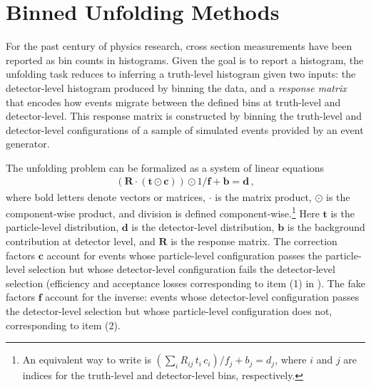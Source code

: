 \section{Binned Unfolding Methods}
\label{sec:binned-unfolding-methods}

For the past century of physics research, cross section measurements have been reported as bin counts in histograms.
Given the goal is to report a histogram, the unfolding task reduces to inferring a truth-level histogram given two inputs: the detector-level histogram produced by binning the data, and a \textit{response matrix} that encodes how events migrate between the defined bins at truth-level and detector-level.
This response matrix is constructed by binning the truth-level and detector-level configurations of a sample of simulated events provided by an event generator.

The unfolding problem can be formalized as a system of linear equations
\begin{align}
\label{eq:foldingequation}
\left(\textbf{R}\cdot (\textbf{t}\odot \textbf{c})\right)\odot 1/\textbf{f}+\textbf{b}=\textbf{d}\,,
\end{align}
where bold letters denote vectors or matrices, $\cdot$ is the matrix product, $\odot$ is the component-wise product, and division is defined component-wise.\footnote{An equivalent way to write  is $\left(\sum_{i}R_{ij}\,t_i\,c_i\right)/f_j+b_j=d_j$, where $i$ and $j$ are indices for the truth-level and detector-level bins, respectively.}
Here $\textbf{t}$ is the particle-level distribution, $\textbf{d}$ is the detector-level distribution, $\textbf{b}$ is the background contribution at detector level, and $\textbf{R}$ is the response matrix.
The correction factors $\textbf{c}$ account for events whose particle-level configuration passes the particle-level selection but whose detector-level configuration fails the detector-level selection (efficiency and acceptance losses corresponding to item (1) in ).
The fake factors $\textbf{f}$ account for the inverse: events whose detector-level configuration passes the detector-level selection but whose particle-level configuration does not, corresponding to item (2).


